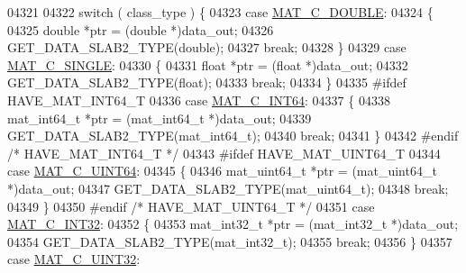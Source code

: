 \begin{DoxyCode}
{{{{{{{{{{{{{{{{{{{{{{{{{04321 
04322             \textcolor{keywordflow}{switch} ( class\_type ) \{
04323                 \textcolor{keywordflow}{case} \hyperlink{group___m_a_t_ggad4d60ae7b709fc81bfd744fb4c857c40a5d70e0862e5bdb7bd86bf7ba5948f307}{MAT\_C\_DOUBLE}:
04324                 \{
04325                     \textcolor{keywordtype}{double} *ptr = (\textcolor{keywordtype}{double} *)data\_out;
04326                     GET\_DATA\_SLAB2\_TYPE(\textcolor{keywordtype}{double});
04327                     \textcolor{keywordflow}{break};
04328                 \}
04329                 \textcolor{keywordflow}{case} \hyperlink{group___m_a_t_ggad4d60ae7b709fc81bfd744fb4c857c40a2825631e26a961cbe0f79db50a39cea2}{MAT\_C\_SINGLE}:
04330                 \{
04331                     \textcolor{keywordtype}{float} *ptr = (\textcolor{keywordtype}{float} *)data\_out;
04332                     GET\_DATA\_SLAB2\_TYPE(\textcolor{keywordtype}{float});
04333                     \textcolor{keywordflow}{break};
04334                 \}
04335 \textcolor{preprocessor}{#ifdef HAVE\_MAT\_INT64\_T}
04336                 \textcolor{keywordflow}{case} \hyperlink{group___m_a_t_ggad4d60ae7b709fc81bfd744fb4c857c40a1ea83bcde49b35477494412973f82409}{MAT\_C\_INT64}:
04337                 \{
04338                     mat\_int64\_t *ptr = (mat\_int64\_t *)data\_out;
04339                     GET\_DATA\_SLAB2\_TYPE(mat\_int64\_t);
04340                     \textcolor{keywordflow}{break};
04341                 \}
04342 \textcolor{preprocessor}{#endif }\textcolor{comment}{/* HAVE\_MAT\_INT64\_T */}\textcolor{preprocessor}{}
04343 \textcolor{preprocessor}{#ifdef HAVE\_MAT\_UINT64\_T}
04344                 \textcolor{keywordflow}{case} \hyperlink{group___m_a_t_ggad4d60ae7b709fc81bfd744fb4c857c40a86470e25c3763d9a24623f04326195dd}{MAT\_C\_UINT64}:
04345                 \{
04346                     mat\_uint64\_t *ptr = (mat\_uint64\_t *)data\_out;
04347                     GET\_DATA\_SLAB2\_TYPE(mat\_uint64\_t);
04348                     \textcolor{keywordflow}{break};
04349                 \}
04350 \textcolor{preprocessor}{#endif }\textcolor{comment}{/* HAVE\_MAT\_UINT64\_T */}\textcolor{preprocessor}{}
04351                 \textcolor{keywordflow}{case} \hyperlink{group___m_a_t_ggad4d60ae7b709fc81bfd744fb4c857c40adb44fc39694e3152ae5e69470a2fefe8}{MAT\_C\_INT32}:
04352                 \{
04353                     mat\_int32\_t *ptr = (mat\_int32\_t *)data\_out;
04354                     GET\_DATA\_SLAB2\_TYPE(mat\_int32\_t);
04355                     \textcolor{keywordflow}{break};
04356                 \}
04357                 \textcolor{keywordflow}{case} \hyperlink{group___m_a_t_ggad4d60ae7b709fc81bfd744fb4c857c40a9a17a7edd45b19ef68197db81b27e816}{MAT\_C\_UINT32}:
}}}}}}}}}}}}}}}}}}}}}}}}}
\end{DoxyCode}
